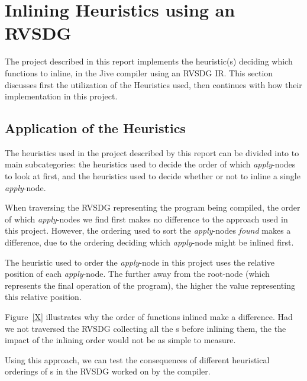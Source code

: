 
\clearpage
\section{Inlining Heuristics using an RVSDG}


The project described in this report implements the heuristic(s) deciding which
functions to inline, in the Jive compiler using an RVSDG IR. This section
discusses first the utilization of the Heuristics used, then continues with how
their implementation in this project.

\subsection{Application of the Heuristics}

The heuristics used in the project described by this report can be divided into
to main subcategories: the heuristics used to decide the order of which
\textit{apply}-nodes to look at first, and the heuristics used to decide whether
or not to inline a single \textit{apply}-node.

When traversing the RVSDG representing the program being compiled, the order of
which \textit{apply}-nodes we find first makes no difference to the approach
used in this project. However, the ordering used to sort the
\textit{apply}-nodes \textit{found} makes a difference, due to the ordering
deciding which \textit{apply}-node might be inlined first.

The
heuristic used
to order the \textit{apply}-node
in this project uses the relative
position of each \textit{apply}-node.
The further away from the root-node (which
represents the final operation of the program),
the higher the value representing this relative position.


Figure~\ref{X} illustrates why the order of functions inlined make a difference.
Had we not traversed the RVSDG collecting all the \applyNode s before inlining
them, the the impact of the inlining order would not be as simple to measure.

Using this approach, we can test the
consequences of different heuristical orderings of \applyNode s in the RVSDG
worked on by the compiler.

